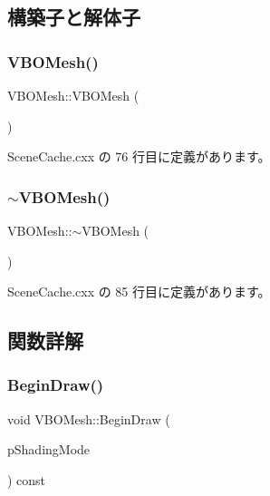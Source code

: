 \subsection{構築子と解体子}
\mbox{\label{class_v_b_o_mesh_ab88ca42807ca0c7dca8a9a661785e594}} 
\subsubsection{\texorpdfstring{V\+B\+O\+Mesh()}{VBOMesh()}}
{\footnotesize\ttfamily V\+B\+O\+Mesh\+::\+V\+B\+O\+Mesh (\begin{DoxyParamCaption}{ }\end{DoxyParamCaption})}



 Scene\+Cache.\+cxx の 76 行目に定義があります。

\mbox{\label{class_v_b_o_mesh_a96e0ef2a5ae81cb9b5741bf51b12846c}} 
\subsubsection{\texorpdfstring{$\sim$\+V\+B\+O\+Mesh()}{~VBOMesh()}}
{\footnotesize\ttfamily V\+B\+O\+Mesh\+::$\sim$\+V\+B\+O\+Mesh (\begin{DoxyParamCaption}{ }\end{DoxyParamCaption})}



 Scene\+Cache.\+cxx の 85 行目に定義があります。



\subsection{関数詳解}
\mbox{\label{class_v_b_o_mesh_a6b9fc2d81780037985624151a1ae1df9}} 
\subsubsection{\texorpdfstring{Begin\+Draw()}{BeginDraw()}}
{\footnotesize\ttfamily void V\+B\+O\+Mesh\+::\+Begin\+Draw (\begin{DoxyParamCaption}\item[{\hyperlink{_gl_functions_8h_a474716bb9224d44d614704a0bd331d99}{Shading\+Mode}}]{p\+Shading\+Mode }\end{DoxyParamCaption}) const}



